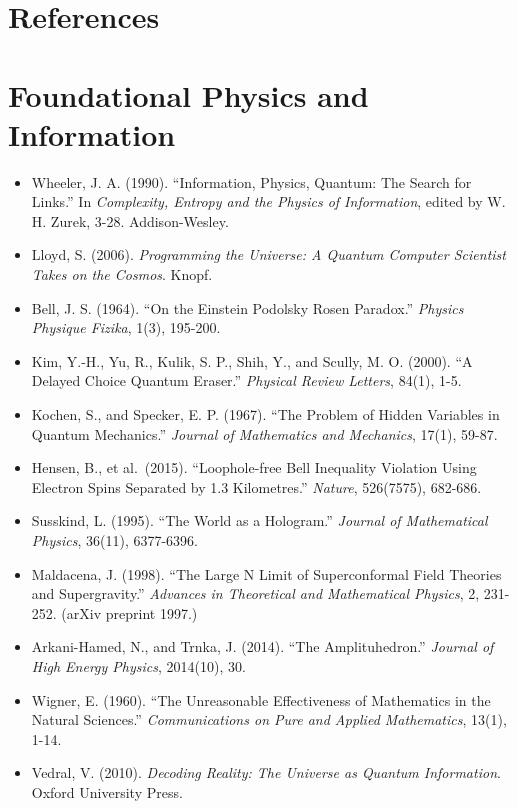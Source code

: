 \documentclass[12pt]{article}
\providecommand{\tightlist}{\setlength{\itemsep}{0pt}\setlength{\parskip}{0pt}}
\begin{document}
\bigskip

\section{References}\label{references}

\section{Foundational Physics and
Information}\label{foundational-physics-and-information}

\begin{itemize}
\tightlist
\item
  Wheeler, J. A. (1990). ``Information, Physics, Quantum: The Search for
  Links.'' In \emph{Complexity, Entropy and the Physics of Information},
  edited by W. H. Zurek, 3-28. Addison-Wesley.
\item
  Lloyd, S. (2006). \emph{Programming the Universe: A Quantum Computer
  Scientist Takes on the Cosmos}. Knopf.
\item
  Bell, J. S. (1964). ``On the Einstein Podolsky Rosen Paradox.''
  \emph{Physics Physique Fizika}, 1(3), 195-200.
\item
  Kim, Y.-H., Yu, R., Kulik, S. P., Shih, Y., and Scully, M. O. (2000).
  ``A Delayed Choice Quantum Eraser.'' \emph{Physical Review Letters},
  84(1), 1-5.
\item
  Kochen, S., and Specker, E. P. (1967). ``The Problem of Hidden
  Variables in Quantum Mechanics.'' \emph{Journal of Mathematics and
  Mechanics}, 17(1), 59-87.
\item
  Hensen, B., et al.~(2015). ``Loophole-free Bell Inequality Violation
  Using Electron Spins Separated by 1.3 Kilometres.'' \emph{Nature},
  526(7575), 682-686.
\item
  Susskind, L. (1995). ``The World as a Hologram.'' \emph{Journal of
  Mathematical Physics}, 36(11), 6377-6396.
\item
  Maldacena, J. (1998). ``The Large N Limit of Superconformal Field
  Theories and Supergravity.'' \emph{Advances in Theoretical and
  Mathematical Physics}, 2, 231-252. (arXiv preprint 1997.)
\item
  Arkani-Hamed, N., and Trnka, J. (2014). ``The Amplituhedron.''
  \emph{Journal of High Energy Physics}, 2014(10), 30.
\item
  Wigner, E. (1960). ``The Unreasonable Effectiveness of Mathematics in
  the Natural Sciences.'' \emph{Communications on Pure and Applied
  Mathematics}, 13(1), 1-14.
\item
  Vedral, V. (2010). \emph{Decoding Reality: The Universe as Quantum
  Information}. Oxford University Press.
\end{itemize}
\end{document}
